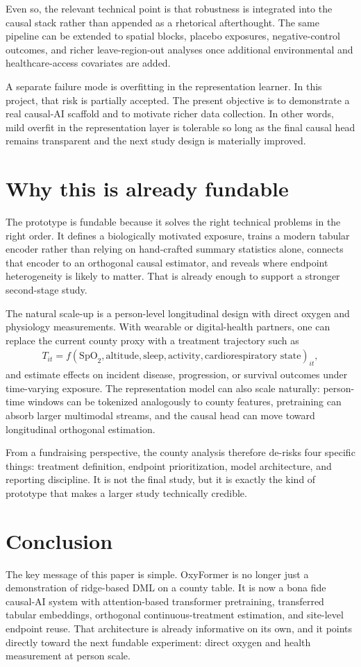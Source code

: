 \documentclass[11pt]{article}
\begin{document}
Even so, the relevant technical point is that robustness is integrated into the causal stack rather than appended as a rhetorical afterthought. The same pipeline can be extended to spatial blocks, placebo exposures, negative-control outcomes, and richer leave-region-out analyses once additional environmental and healthcare-access covariates are added.

A separate failure mode is overfitting in the representation learner. In this project, that risk is partially accepted. The present objective is to demonstrate a real causal-AI scaffold and to motivate richer data collection. In other words, mild overfit in the representation layer is tolerable so long as the final causal head remains transparent and the next study design is materially improved.

\section{Why this is already fundable}
The prototype is fundable because it solves the right technical problems in the right order. It defines a biologically motivated exposure, trains a modern tabular encoder rather than relying on hand-crafted summary statistics alone, connects that encoder to an orthogonal causal estimator, and reveals where endpoint heterogeneity is likely to matter. That is already enough to support a stronger second-stage study.

The natural scale-up is a person-level longitudinal design with direct oxygen and physiology measurements. With wearable or digital-health partners, one can replace the current county proxy with a treatment trajectory such as
\begin{align}
T_{it} = f(\mathrm{SpO}_2, \text{altitude}, \text{sleep}, \text{activity}, \text{cardiorespiratory state})_{it},
\end{align}
and estimate effects on incident disease, progression, or survival outcomes under time-varying exposure. The representation model can also scale naturally: person-time windows can be tokenized analogously to county features, pretraining can absorb larger multimodal streams, and the causal head can move toward longitudinal orthogonal estimation.

From a fundraising perspective, the county analysis therefore de-risks four specific things: treatment definition, endpoint prioritization, model architecture, and reporting discipline. It is not the final study, but it is exactly the kind of prototype that makes a larger study technically credible.

\section{Conclusion}
The key message of this paper is simple. OxyFormer is no longer just a demonstration of ridge-based DML on a county table. It is now a bona fide causal-AI system with attention-based transformer pretraining, transferred tabular embeddings, orthogonal continuous-treatment estimation, and site-level endpoint reuse. That architecture is already informative on its own, and it points directly toward the next fundable experiment: direct oxygen and health measurement at person scale.
\end{document}
